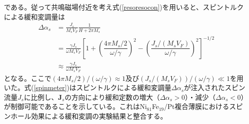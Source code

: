 である。従って共鳴磁場付近を考え式(\ref{resoresocon})を用いると、スピントルクによる緩和変調量は
\begin{align}
\Delta\alpha_s&= \frac{{{J_s}}}{{{M_s}{V_F}}}\frac{1}{{H + 2\pi {M_s}}}\nonumber\\
&=\frac{{\gamma {J_s}}}{{\omega {M_s}{V_F}}}\left[1 + {{\left( {\dfrac{{4\pi {M_s}/2}}{{\omega /\gamma }}} \right)}^2} - {\left( {\dfrac{{{J_s}/({M_s}{V_F})}}{{\omega /\gamma }}} \right)}^2\right]^{-1/2} \nonumber\\
&\approx \frac{{\gamma {J_s}}}{{\omega {M_s}{V_F}}}\label{spinmeter}
\end{align} 
となる。ここで$( 4\pi {M_s}/2)/(\omega /\gamma )\approx 1$及び$(J_s/({M_s}{V_F}))/(\omega /\gamma )\ll 1$を用いた。式(\ref{spinmeter})はスピントルクによる緩和変調量$\Delta\alpha_s$が注入されたスピン流量$J_s$に比例し、$\bm{J}_s$の方向により緩和定数の増大（$\Delta\alpha_s>0$）・減少（$\Delta\alpha_s<0$）が制御可能であることを示している。これはNi$_{81}$Fe$_{19}$/Pt複合薄膜におけるスピンホール効果による緩和変調の実験結果と整合する。


